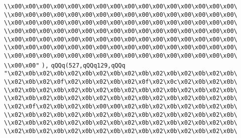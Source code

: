 \verb|\\x00\x00\x00\x00\x00\x00\x00\x00\x00\x00\x00\x00\x00\x00\x00\x00\|\newline
\verb|\\x00\x00\x00\x00\x00\x00\x00\x00\x00\x00\x00\x00\x00\x00\x00\x00\|\newline
\verb|\\x00\x00\x00\x00\x00\x00\x00\x00\x00\x00\x00\x00\x00\x00\x00\x00\|\newline
\verb|\\x00\x00\x00\x00\x00\x00\x00\x00\x00\x00\x00\x00\x00\x00\x00\x00\|\newline
\verb|\\x00\x00\x00\x00\x00\x00\x00\x00\x00\x00\x00\x00\x00\x00\x00\x00\|\newline
\verb|\\x00\x00\x00\x00\x00\x00\x00\x00\x00\x00\x00\x00\x00\x00\x00\x00\|\newline
\verb|\\x00\x00\x00\x00\x00\x00\x00\x00\x00\x00\x00\x00\x00\x00\x00\x00\|\newline
\verb|\\x00\x00"|\newline
\verb|),|\newline
\verb|qQQq(527,qQQq129,qQQq|\newline
\verb|"\x02\x0b\x02\x0b\x02\x0b\x02\x0b\x02\x0b\x02\x0b\x02\x0b\x02\x0b\|\newline
\verb|\\x02\x0b\x02\x0f\x02\x0b\x02\x0b\x02\x0f\x02\x0c\x02\x0b\x02\x0b\|\newline
\verb|\\x02\x0b\x02\x0b\x02\x0b\x02\x0b\x02\x0b\x02\x0b\x02\x0b\x02\x0b\|\newline
\verb|\\x02\x0b\x02\x0b\x02\x0b\x02\x0b\x02\x0b\x02\x0b\x02\x0b\x02\x0b\|\newline
\verb|\\x02\x0f\x02\x0b\x02\x0b\x00\x00\x02\x0b\x02\x0b\x02\x0b\x02\x0b\|\newline
\verb|\\x02\x0b\x02\x0b\x02\x0b\x02\x0b\x02\x0b\x02\x0b\x02\x0b\x02\x0b\|\newline
\verb|\\x02\x0b\x02\x0b\x02\x0b\x02\x0b\x02\x0b\x02\x0b\x02\x0b\x02\x0b\|\newline
\verb|\\x02\x0b\x02\x0b\x02\x0b\x02\x0b\x02\x0b\x02\x0b\x02\x0b\x02\x0b\|\newline

